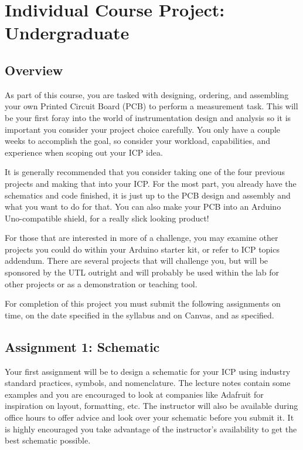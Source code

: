 %


\chapter{Individual Course Project: Undergraduate}
\setchapterpreamble[u]{\margintoc}

\section*{Overview}
As part of this course, you are tasked with designing, ordering, and assembling your own Printed Circuit Board (PCB) to perform a measurement task.
This will be your first foray into the world of instrumentation design and analysis so it is important you consider your project choice carefully.
You only have a couple weeks to accomplish the goal, so consider your workload, capabilities, and experience when scoping out your ICP idea.

It is generally recommended that you consider taking one of the four previous projects and making that into your ICP.
For the most part, you already have the schematics and code finished, it is just up to the PCB design and assembly and what you want to do for that.
You can also make your PCB into an Arduino Uno-compatible shield, for a really slick looking product!

For those that are interested in more of a challenge, you may examine other projects you could do within your Arduino starter kit, or refer to ICP topics addendum.
There are several projects that will challenge you, but will be sponsored by the UTL outright and will probably be used within the lab for other projects or as a demonstration or teaching tool.

For completion of this project you must submit the following assignments on time, on the date specified in the syllabus and on Canvas, and as specified.

\section*{Assignment 1: Schematic}
Your first assignment will be to design a schematic for your ICP using industry standard practices, symbols, and nomenclature.
The lecture notes contain some examples and you are encouraged to look at companies like Adafruit for inspiration on layout, formatting, etc.
The instructor will also be available during office hours to offer advice and look over your schematic before you submit it.
It is highly encouraged you take advantage of the instructor's availability to get the best schematic possible.

